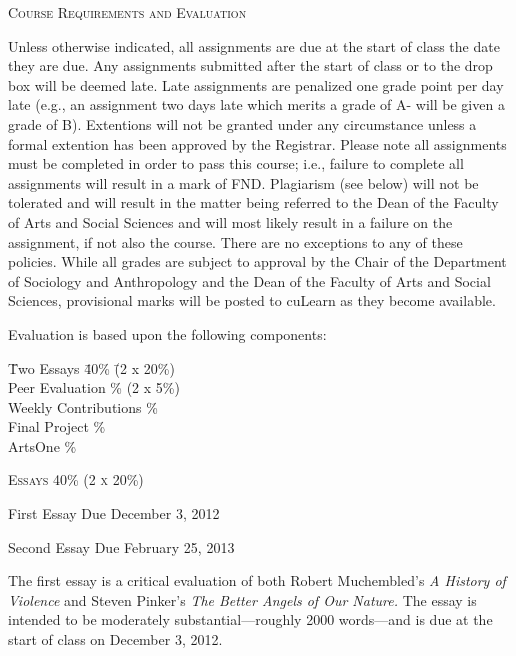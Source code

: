 \documentclass[12pt]{article}
\begin{document}
{\Large \textsc{Course Requirements and Evaluation}}

Unless otherwise indicated, all assignments are due at the start of class the date they are due. Any assignments submitted after the start of class or to the drop box will be deemed late. Late assignments are penalized one grade point per day late (e.g., an assignment two days late which merits a grade of A- will be given a grade of B). Extentions will not be granted under any circumstance unless a formal extention has been approved by the Registrar. Please note all assignments must be completed in order to pass this course; i.e., failure to complete all assignments will result in a mark of FND. Plagiarism (see below) will not be tolerated and will result in the matter being referred to the Dean of the Faculty of Arts and Social Sciences and will most likely result in a failure on the assignment, if not also the course. There are no exceptions to any of these policies. While all grades are subject to approval by the Chair of the Department of Sociology and Anthropology and the Dean of the Faculty of Arts and Social Sciences, provisional marks will be posted to cuLearn as they become available.

Evaluation is based upon the following components:

\begin{tabbing}
\hspace{.5in} \= Two Essays \hspace{1.25in} \= 40\% \hspace{.25in} \= (2 x 20\%)\\
\> Peer Evaluation \% \> (2 x 5\%) \\
\> Weekly Contributions \% \\
\> Final Project \% \\
\> ArtsOne \%
\end{tabbing}

{\large \textsc{Essays 40\% (2 x 20\%)}}

\hspace{.5in} First Essay Due December 3, 2012

\hspace{.5in} Second Essay Due February 25, 2013

The first essay is a critical evaluation of both Robert Muchembled's \textit{A History of Violence} and Steven Pinker's \textit{The Better Angels of Our Nature.} The essay is intended to be moderately substantial---roughly 2000 words---and is due at the start of class on December 3, 2012. 
\end{document}
